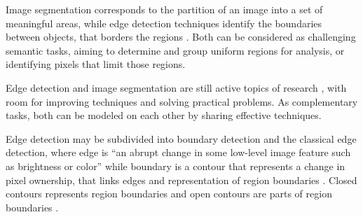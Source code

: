 


Image segmentation corresponds to the partition of an image into a set of meaningful areas, while edge detection techniques identify the boundaries between objects, that borders the regions \cite{Dominguez:2016} \cite{gonzalez2002digital}.
Both can be considered as challenging semantic tasks, aiming to determine and group uniform regions for analysis, or identifying pixels that limit those regions.

Edge detection and image segmentation are still active topics of research \cite{Khan:2020} \cite{Sun:2022}, with room for improving techniques and solving practical problems.
As complementary tasks, both can be modeled on each other by sharing effective techniques.

{\color{red}
Edge detection may be subdivided into boundary detection and the classical edge detection, where edge is ``an abrupt change in some low-level image feature such as brightness or color'' while boundary is a contour that represents a change in pixel ownership, that links edges and representation of region boundaries \cite{MARTIN:1273918} \cite{Jain:1995}.
Closed contours represents region boundaries and open contours are parts of region boundaries \cite{Jain:1995}.
}


